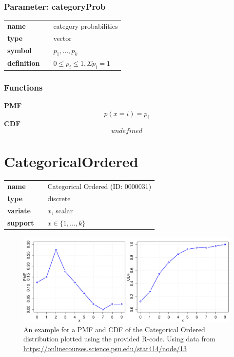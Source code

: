 \subsubsection*{Parameter: categoryProb}

\noindent\begin{tabular}{p{2cm}cl}
\textbf{name} & & category probabilities \\
\textbf{type} & & vector \\
\textbf{symbol} & & $p_1, \ldots, p_k$  \\
\textbf{definition} & & $0 \leq p_i \leq 1, \Sigma p_i = 1$
\end{tabular}
\subsubsection*{Functions}

\smallskip \noindent \hspace{.2cm} \textbf{PMF} 
\begin{equation*}p(x=i)=p_i\end{equation*}
\smallskip \noindent \hspace{.2cm} \textbf{CDF} 
\begin{equation*}undefined\end{equation*}
\smallskip\section*{CategoricalOrdered} 

  \bigskip 

\begin{tabular}{p{2cm}cl}
\textbf{name} & & Categorical Ordered (ID: 0000031)\\ 
 
\textbf{type} & & discrete \\ 

\textbf{variate} & & $x$, scalar \\ 

\textbf{support} & & $x \in \{1,\dots,k\}$
\end{tabular}

\begin{figure}[htb!]
\centering
  \includegraphics[width=140mm]{pics/CategoricalOrdered_pmf_cdf.pdf}
 \caption{An example for a PMF and CDF of the Categorical Ordered distribution 
 plotted using the provided R-code. Using data from \url{https://onlinecourses.science.psu.edu/stat414/node/13}}
 \label{fig:CategoricalOrdered_pmf_cdf}
\end{figure}

